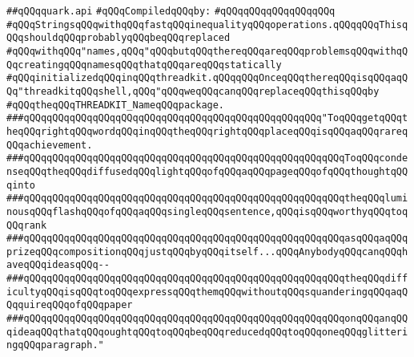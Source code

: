 \label{src/lib/x-kit/style/quark.api}
\verb|##qQQqquark.api|\newline
\newline
\verb|#qQQqCompiledqQQqby:|\newline
\verb|#qQQqqQQqqQQqqQQqqQQq|\newline
\newline
\newline
\newline
\verb|#qQQqStringsqQQqwithqQQqfastqQQqinequalityqQQqoperations.qQQqqQQqThisqQQqshouldqQQqprobablyqQQqbeqQQqreplaced|\newline
\verb|#qQQqwithqQQq"names,qQQq"qQQqbutqQQqthereqQQqareqQQqproblemsqQQqwithqQQqcreatingqQQqnamesqQQqthatqQQqareqQQqstatically|\newline
\verb|#qQQqinitializedqQQqinqQQqthreadkit.qQQqqQQqOnceqQQqthereqQQqisqQQqaqQQq"threadkitqQQqshell,qQQq"qQQqweqQQqcanqQQqreplaceqQQqthisqQQqby|\newline
\verb|#qQQqtheqQQqTHREADKIT_NameqQQqpackage.|\newline
\newline
\newline
\newline
\newline
\verb|###qQQqqQQqqQQqqQQqqQQqqQQqqQQqqQQqqQQqqQQqqQQqqQQqqQQq"ToqQQqgetqQQqtheqQQqrightqQQqwordqQQqinqQQqtheqQQqrightqQQqplaceqQQqisqQQqaqQQqrareqQQqachievement.|\newline
\verb|###qQQqqQQqqQQqqQQqqQQqqQQqqQQqqQQqqQQqqQQqqQQqqQQqqQQqqQQqToqQQqcondenseqQQqtheqQQqdiffusedqQQqlightqQQqofqQQqaqQQqpageqQQqofqQQqthoughtqQQqinto|\newline
\verb|###qQQqqQQqqQQqqQQqqQQqqQQqqQQqqQQqqQQqqQQqqQQqqQQqqQQqqQQqtheqQQqluminousqQQqflashqQQqofqQQqaqQQqsingleqQQqsentence,qQQqisqQQqworthyqQQqtoqQQqrank|\newline
\verb|###qQQqqQQqqQQqqQQqqQQqqQQqqQQqqQQqqQQqqQQqqQQqqQQqqQQqqQQqasqQQqaqQQqprizeqQQqcompositionqQQqjustqQQqbyqQQqitself...qQQqAnybodyqQQqcanqQQqhaveqQQqideasqQQq--|\newline
\verb|###qQQqqQQqqQQqqQQqqQQqqQQqqQQqqQQqqQQqqQQqqQQqqQQqqQQqqQQqtheqQQqdifficultyqQQqisqQQqtoqQQqexpressqQQqthemqQQqwithoutqQQqsquanderingqQQqaqQQqquireqQQqofqQQqpaper|\newline
\verb|###qQQqqQQqqQQqqQQqqQQqqQQqqQQqqQQqqQQqqQQqqQQqqQQqqQQqqQQqonqQQqanqQQqideaqQQqthatqQQqoughtqQQqtoqQQqbeqQQqreducedqQQqtoqQQqoneqQQqglitteringqQQqparagraph."|\newline
